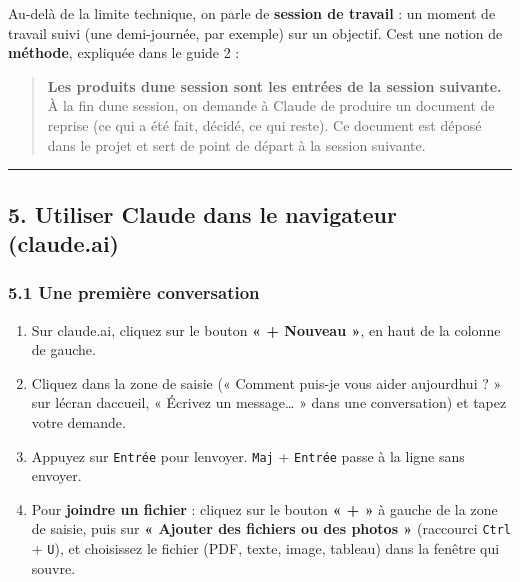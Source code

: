 \documentclass[
  french,
  11pt,
  a4paper,
]{article}
\providecommand{\tightlist}{%
  \setlength{\itemsep}{0pt}\setlength{\parskip}{0pt}}
\begin{document}
Au-delà de la limite technique, on parle de \textbf{session de travail}
: un moment de travail suivi (une demi-journée, par exemple) sur un
objectif. C\textquotesingle est une notion de \textbf{méthode},
expliquée dans le guide 2 :

\begin{quote}
\textbf{Les produits d\textquotesingle une session sont les entrées de
la session suivante.} À la fin d\textquotesingle une session, on demande
à Claude de produire un document de reprise (ce qui a été fait, décidé,
ce qui reste). Ce document est déposé dans le projet et sert de point de
départ à la session suivante.
\end{quote}

\begin{center}\rule{0.5\linewidth}{0.5pt}\end{center}

\subsection{5. Utiliser Claude dans le navigateur
(claude.ai)}\label{5-utiliser-claude-dans-le-navigateur-claudeai}

\subsubsection{5.1 Une première
conversation}\label{51-une-premiuxe8re-conversation}

\begin{enumerate}
\def\labelenumi{\arabic{enumi}.}
\tightlist
\item
  Sur claude.ai, cliquez sur le bouton \textbf{« + Nouveau »}, en haut
  de la colonne de gauche.
\item
  Cliquez dans la zone de saisie (« Comment puis-je vous aider
  aujourd\textquotesingle hui ? » sur l\textquotesingle écran
  d\textquotesingle accueil, « Écrivez un message\ldots{} » dans une
  conversation) et tapez votre demande.
\item
  Appuyez sur \texttt{Entrée} pour l\textquotesingle envoyer.
  \texttt{Maj} + \texttt{Entrée} passe à la ligne sans envoyer.
\item
  Pour \textbf{joindre un fichier} : cliquez sur le bouton \textbf{« +
  »} à gauche de la zone de saisie, puis sur \textbf{« Ajouter des
  fichiers ou des photos »} (raccourci \texttt{Ctrl} + \texttt{U}), et
  choisissez le fichier (PDF, texte, image, tableau) dans la fenêtre qui
  s\textquotesingle ouvre.
\end{enumerate}
\end{document}

